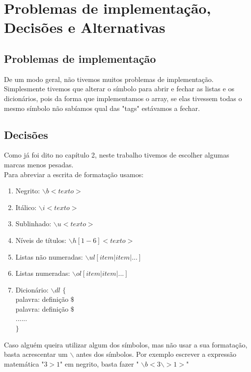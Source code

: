 \documentclass{report}
\begin{document}
\section{Problemas de implementação, Decisões e Alternativas}
\subsection{Problemas de implementação}

De um modo geral, não tivemos muitos problemas de implementação. Simplesmente tivemos que alterar o símbolo para abrir e fechar as listas e os dicionários, pois da forma que implementamos o array, se elas tivessem todas o mesmo símbolo não sabíamos qual das "tags" estávamos a fechar.    


\subsection{Decisões}
Como já foi dito no capítulo 2, neste trabalho tivemos de escolher algumas marcas menos pesadas.\\ 
Para abreviar a escrita de formatação usamos: 

\begin{enumerate}[1-] 

\item Negrito: $\backslash$$b$$<texto>$ 

\item Itálico: $\backslash$$i$$<texto>$ 

\item Sublinhado: $\backslash$$u$$<texto>$ 

\item Níveis de títulos: $\backslash$$h[1-6]$$<texto>$ 

\item Listas não numeradas: $\backslash$$ul$$[item | item|... ]$ 

\item Listas numeradas: $\backslash$$ol$$[item | item|... ]$ 

\item Dicionário: $\backslash$$dl$ $\{$ \\ 
palavra: definição $\$$\\ 
palavra: definição $\$$\\ 
......\\ 
$\}$

\end{enumerate}
Caso alguém queira utilizar algum dos símbolos, mas não usar a sua formatação, basta acrescentar um $\backslash$ 
antes dos símbolos. Por exemplo escrever a expressão matemática "$3>1$" em negrito, basta fazer  " $\backslash$$b$$<3$$\backslash$$>1>$" 
\end{document}
